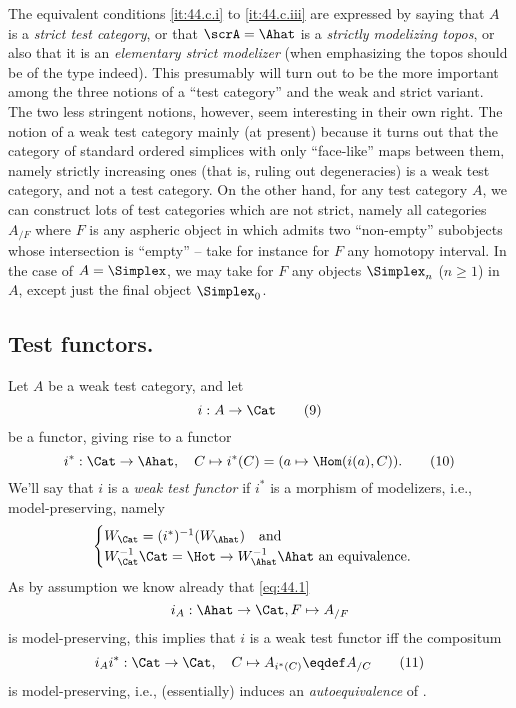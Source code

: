 The equivalent conditions \ref{it:44.c.i} to \ref{it:44.c.iii} are
expressed by saying that $A$ is a \emph{strict test category}, or that
$\scrA=\Ahat$ is a \emph{strictly modelizing topos}, or also that it
is an \emph{elementary strict modelizer} (when emphasizing the topos
\scrA{} should be of the type \Ahat{} indeed). This presumably will
turn out to be the more important among the three notions of a ``test
category'' and the weak and strict variant. The two less stringent
notions, however, seem interesting in their own right. The notion of a
weak test category mainly (at present) because it turns out that the
category \Simplexf{} of standard ordered simplices with
only ``face-like'' maps between them, namely strictly increasing ones
(that is, ruling out degeneracies) is a weak test category, and not a
test category. On the other hand, for any test category $A$, we can
construct lots of test categories which are not strict, namely all
categories $A_{/F}$ where $F$ is any aspheric object in \Ahat{} which
admits two ``non-empty'' subobjects whose intersection is ``empty'' --
take for instance for $F$ any homotopy interval. In the case of
$A=\Simplex$, we may take for $F$ any objects $\Simplex_n$ ($n\ge1$) in
$A$, except just the final object $\Simplex_0$.

\subsection[Weak test functors and test functors (with values in
\texorpdfstring{\Cat}{(Cat)}).]{Test functors.}

Let $A$ be a weak test category, and let
\begin{equation}
  \label{eq:44.9}
  i : A \to \Cat\tag{9}
\end{equation}
be a functor, giving rise to a functor
\begin{equation}
  \label{eq:44.10}
  i^*: \Cat\to\Ahat,\quad C\mapsto i^*(C)=(a\mapsto\Hom(i(a),C)).\tag{10}
\end{equation}
We'll say that $i$ is a \emph{weak test functor} if $i^*$ is a
morphism of modelizers, i.e., model-preserving, namely
\[
\begin{cases}
  W_\Cat=(i^*)^{-1}(W_\Ahat) \quad\text{and} \\
  W_\Cat^{-1}\Cat = \Hot \to W_\Ahat^{-1}\Ahat\text{ an equivalence.}
\end{cases}\]
As by assumption we know already that \eqref{eq:44.1}
\[ i_A : \Ahat\to\Cat, F\mapsto A_{/F}\]
is model-preserving, this implies that $i$ is a weak test functor
if{f} the compositum
\begin{equation}
  \label{eq:44.11}
  i_Ai^*:\Cat\to\Cat,\quad C\mapsto A_{i^*(C)} \eqdef A_{/C}\tag{11}
\end{equation}
is model-preserving, i.e., (essentially) induces an
\emph{autoequivalence} of \Hot.

